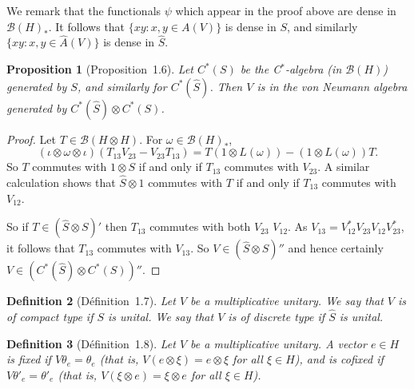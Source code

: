 \documentclass[a4paper,12pt]{article}
\theoremstyle{plain}
\newtheorem{proposition}{Proposition}[section]
\newtheorem{definition}[proposition]{Definition}
\theoremstyle{definition}
\newcommand{\mc}{\mathcal}
\begin{document}
We remark that the functionals $\psi$ which appear in the proof above
are dense in $\mc B(H)_*$.  It follows that $\{ xy : x,y\in A(V) \}$ is dense
in $S$, and similarly $\{ xy : x,y\in\hat A(V) \}$ is dense in $\hat S$.

\begin{proposition}[Proposition~1.6]
Let $C^*(S)$ be the C$^*$-algebra (in $\mc B(H)$) generated by $S$,
and similarly for $C^*(\hat S)$.  Then $V$ is in the von Neumann algebra
generated by $C^*(\hat S) \otimes C^*(S)$.
\end{proposition}
\begin{proof}
Let $T\in\mc B(H\otimes H)$.  For $\omega\in\mc B(H)_*$,
\[ (\iota\otimes\omega\otimes\iota)(T_{13}V_{23} - V_{23}T_{13})
= T(1\otimes L(\omega)) - (1\otimes L(\omega))T. \]
So $T$ commutes with $1\otimes S$ if and only if $T_{13}$ commutes
with $V_{23}$.  A similar calculation shows that $\hat S\otimes 1$
commutes with $T$ if and only if $T_{13}$ commutes with $V_{12}$.

So if $T\in (\hat S\otimes S)'$ then $T_{13}$ commutes with both $V_{23}$
$V_{12}$.  As $V_{13} = V_{12}^* V_{23} V_{12} V_{23}^*$, it follows that
$T_{13}$ commutes with $V_{13}$.  So $V\in (\hat S\otimes S)''$ and
hence certainly $V \in (C^*(\hat S) \otimes C^*(S))''$.
\end{proof}

\begin{definition}[D\'efinition~1.7]
Let $V$ be a multiplicative unitary.  We say that $V$ is of
\emph{compact type} if $S$ is unital.  We say that $V$ is of
\emph{discrete type} if $\hat S$ is unital.
\end{definition}

\begin{definition}[D\'efinition~1.8]\label{defn:2}
Let $V$ be a multiplicative unitary.  A vector $e\in H$ is
\emph{fixed} if $V\theta_e = \theta_e$ (that is, $V(e\otimes\xi) =
e\otimes\xi$ for all $\xi\in H$), and is \emph{cofixed}
if $V\theta'_e = \theta'_e$ (that is, $V(\xi\otimes e) =
\xi\otimes e$ for all $\xi\in H$).
\end{definition}
\end{document}
